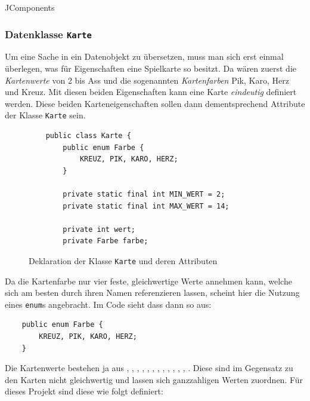\documentclass[a4paper,11pt]{article}
\begin{document}
JComponents

\subsubsection{Datenklasse \texttt{Karte}}
Um eine Sache in ein Datenobjekt zu übersetzen, muss man sich erst einmal überlegen, was für Eigenschaften eine Spielkarte so besitzt. Da wären zuerst die \textit{Kartenwerte} von 2 bis Ass und die sogenannten \textit{Kartenfarben} Pik, Karo, Herz und Kreuz. Mit diesen beiden Eigenschaften kann eine Karte \textit{eindeutig} definiert werden. Diese beiden Karteneigenschaften sollen dann dementsprechend Attribute der Klasse \texttt{Karte} sein.\\

\begin{figure}[H]
\lstset{language=java}
\begin{lstlisting}
    public class Karte {
        public enum Farbe {
            KREUZ, PIK, KARO, HERZ;
        }

        private static final int MIN_WERT = 2;
        private static final int MAX_WERT = 14;

        private int wert;
        private Farbe farbe;
\end{lstlisting}
    \caption{Deklaration der Klasse \texttt{Karte} und deren Attributen}
\end{figure}



Da die Kartenfarbe nur vier feste, gleichwertige Werte annehmen kann, welche sich am besten durch ihren Namen referenzieren lassen, scheint hier die Nutzung eines \texttt{enum}s angebracht. Im Code sieht dass dann so aus:\\ %

\lstset{language=java}
\begin{lstlisting}
    public enum Farbe {
        KREUZ, PIK, KARO, HERZ;
    }
\end{lstlisting}


Die Kartenwerte bestehen ja aus , , , , , , , , , , , , . Diese sind im Gegensatz zu den Karten nicht gleichwertig und lassen sich ganzzahligen Werten zuordnen. Für dieses Projekt sind diese wie folgt definiert:
\end{document}
